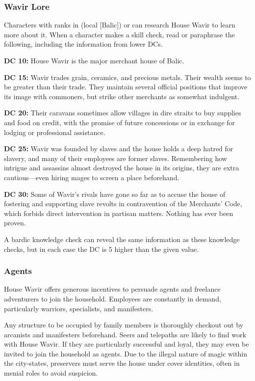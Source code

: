 \subsubsection{Wavir Lore}
Characters with ranks in  (local [Balic]) or  can research House Wavir to learn more about it. When a character makes a skill check, read or paraphrase the following, including the information from lower DCs.

\textbf{DC 10:} House Wavir is the major merchant house of Balic.

\textbf{DC 15:} Wavir trades grain, ceramics, and precious metals. Their wealth seems to be greater than their trade. They maintain several official positions that improve its image with commoners, but strike other merchants as somewhat indulgent. 

\textbf{DC 20:} Their caravans sometimes allow villages in dire straits to buy supplies and food on credit, with the promise of future concessions or in exchange for lodging or professional assistance.

\textbf{DC 25:} Wavir was founded by slaves and the house holds a deep hatred for slavery, and many of their employees are former slaves. Remembering how intrigue and assassins almost destroyed the house in its origins, they are extra cautious---even hiring mages to screen a place beforehand.

\textbf{DC 30:} Some of Wavir's rivals have gone so far as to accuse the house of fostering and supporting slave revolts in contravention of the Merchants' Code, which forbids direct intervention in partisan matters. Nothing has ever been proven.

A bardic knowledge check can reveal the same information as these knowledge checks, but in each case the DC is 5 higher than the given value.

\subsubsection{Agents}
House Wavir offers generous incentives to persuade agents and freelance adventurers to join the household. Employees are constantly in demand, particularly warriors, specialists, and manifesters.

Any structure to be occupied by family members is thoroughly checkout out by arcanists and manifesters beforehand. Seers and telepaths are likely to find work with House Wavir. If they are particularly successful and loyal, they may even be invited to join the household as agents. Due to the illegal nature of magic within the city-states, preservers must serve the house under cover identities, often in menial roles to avoid suspicion.

